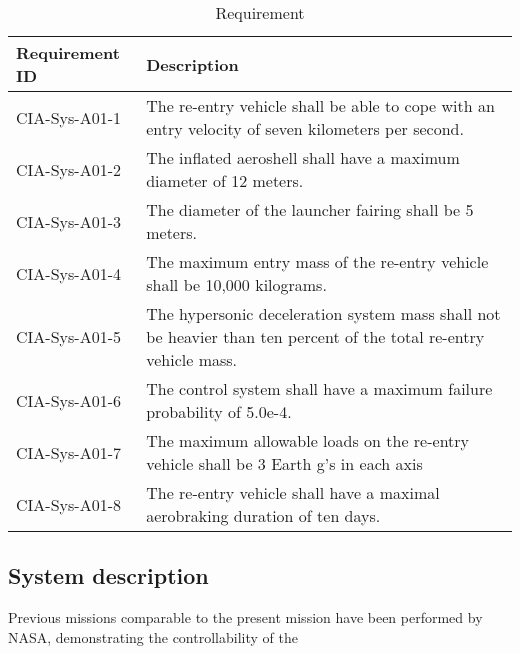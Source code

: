 \begin{table}[H]
	\caption{Requirement}
	\begin{tabular}{|p{}|p{}|}
    \hline
    Requirement ID          & Description                                                                                                      \\ \hline \hline
    CIA-Sys-A01-1 & The re-entry vehicle shall be able to cope with an entry velocity of seven kilometers per second.                \\ \hline
    CIA-Sys-A01-2 & The inflated aeroshell shall have a maximum diameter of 12 meters.                                               \\ \hline
    CIA-Sys-A01-3 & The diameter of the launcher fairing shall be 5 meters.                                                          \\ \hline
    CIA-Sys-A01-4 & The maximum entry mass of the re-entry vehicle shall be 10,000 kilograms.                                         \\ \hline
    CIA-Sys-A01-5 & The hypersonic deceleration system mass shall not be heavier than ten percent of the total re-entry vehicle mass. \\ \hline
    CIA-Sys-A01-6 & The control system shall have a maximum failure probability of 5.0e-4.                                           \\ \hline
    CIA-Sys-A01-7 & The maximum allowable loads on the re-entry vehicle shall be 3 Earth g's in each axis                            \\ \hline
    CIA-Sys-A01-8 & The re-entry vehicle shall have a maximal aerobraking duration of ten days.                                      \\ \hline
    \end{tabular}
    \label{tab:requirements}
\end{table}

\subsection{System description}
Previous missions comparable to the present mission have been performed by NASA, demonstrating the controllability of the 
